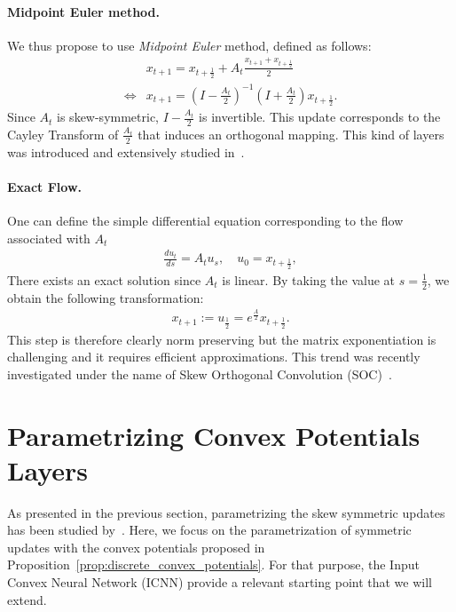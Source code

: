 \paragraph{Midpoint Euler method.}
We thus propose to use \emph{Midpoint Euler} method, defined as follows:
\begin{align*}
&x_{t+1} = x_{t+\frac12} +A_t \frac{x_{t+1}+x_{t+\frac12}}{2}\\
\iff&x_{t+1} = \left(I-\frac{A_t}{2}\right)^{-1}\left(I+\frac{A_t}{2}\right)x_{t+\frac12}.
\end{align*} 
Since $A_t$ is skew-symmetric, $I-\frac{A_t}{2}$ is invertible. This update corresponds to the Cayley Transform of $\frac{A_t}{2}$ that induces an orthogonal mapping. 
This kind of layers was introduced and extensively studied in~\citep{trockman2021orthogonalizing}.  


\paragraph{Exact Flow.} One can define the simple differential equation corresponding to the flow associated with $A_t$  
\begin{align*}
        \frac{du_t}{ds} = A_t u_s,\quad u_0 = x_{t+\frac12},
\end{align*}
There exists an exact solution  since $A_t$ is linear. By taking the value at $s=\frac12$, we obtain the following transformation:  
 \begin{align*}
x_{t+1} := u_{\frac12}=e^{\frac{A}{2}} x_{t+\frac12}.
\end{align*}
This step is therefore clearly norm preserving but the matrix exponentiation is challenging and it requires efficient approximations. This trend was recently investigated under the name of Skew Orthogonal Convolution (SOC)~\cite{skew2021sahil}.


\section{Parametrizing Convex Potentials Layers}
\label{sec:param}

As presented in the previous section, parametrizing the skew symmetric updates has been studied by~\citet{trockman2021orthogonalizing,skew2021sahil}. Here, we focus on  the parametrization of symmetric updates with the convex potentials proposed in Proposition~\ref{prop:discrete_convex_potentials}. For that purpose, the Input Convex Neural Network (ICNN) \citep{amos2017input} provide a relevant starting point that we will extend. 

